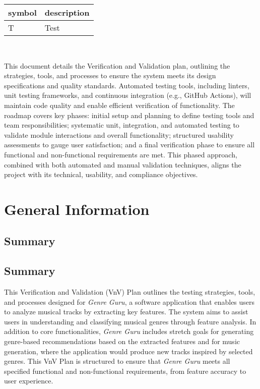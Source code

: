 \documentclass[12pt, titlepage]{article}
\begin{document}
\renewcommand{\arraystretch}{1.2}
\begin{tabular}{l l} 
  \toprule		
  \textbf{symbol} & \textbf{description}\\
  \midrule 
  T & Test\\
  \bottomrule
\end{tabular}\\



\newpage


This document details the Verification and Validation plan, outlining the strategies, 
tools, and processes to ensure the system meets its design specifications and quality standards. 
Automated testing tools, including linters, unit testing frameworks, and continuous integration 
(e.g., GitHub Actions), will maintain code quality and enable efficient verification of functionality. 
The roadmap covers key phases: initial setup and planning to define testing tools and team responsibilities; 
systematic unit, integration, and automated testing to validate module interactions and overall functionality; 
structured usability assessments to gauge user satisfaction; and a final verification phase to ensure all functional 
and non-functional requirements are met. This phased approach, combined with both automated and manual validation 
techniques, aligns the project with its technical, usability, and compliance objectives.

\section{General Information}

\subsection{Summary}

\subsection{Summary}

This Verification and Validation (VnV) Plan outlines the testing strategies, tools, 
and processes designed for \textit{Genre Guru}, a software application that enables users to analyze 
musical tracks by extracting key features. The system aims to assist users in understanding and classifying 
musical genres through feature analysis. In addition to core functionalities, \textit{Genre Guru} includes 
stretch goals for generating genre-based recommendations based on the extracted features and for music generation, 
where the application would produce new tracks inspired by selected genres. This VnV Plan is structured to 
ensure that \textit{Genre Guru} meets all specified functional and non-functional requirements, from feature accuracy 
to user experience.
\end{document}
